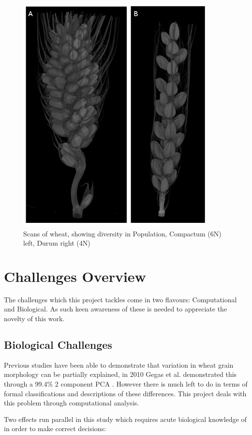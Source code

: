 \documentclass[11pt]{report}
\begin{document}
\begin{figure}[htbp]
\centering
\includegraphics[width=10cm]{./images/spikes.png}
\caption{\label{fig:org5b5d308}
Scans of wheat, showing diversity in Population, Compactum (6N) left, Durum right (4N)}
\end{figure}

\section{Challenges Overview}
\label{sec:org734b86c}

The challenges which this project tackles come in two flavours: Computational and Biological. As such keen awareness of these is needed to appreciate the novelty of this work.

\subsection{Biological Challenges}
\label{sec:orga0ce7e6}
Previous studies have been able to demonstrate that variation in wheat grain morphology can be partially explained, in 2010 Gegas et al. demonstrated this through a 99.4\% 2 component PCA \cite{Gegas2010}. However there is much left to do in terms of formal classifications and descriptions of these differences. This project deals with this problem through computational analysis.

Two effects run parallel in this study which requires acute biological knowledge of in order to make correct decisions:
\end{document}
